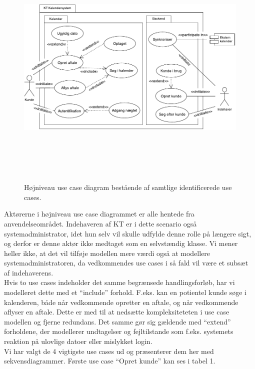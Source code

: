 \documentclass[12pt]{article}   %
\begin{document}
\begin{figure}[!ht]
\begin{center}
\includegraphics[width=12cm, height=12cm]{highlevel.pdf}
\caption{Højniveau use case diagram bestående af samtlige identificerede use cases.}
\label{fig:use}
\end{center}
\end{figure}

 
Aktørerne i højniveau use case diagrammet er alle hentede fra anvendelseområdet. Indehaveren af KT er i dette scenario også systemadministrator, idet hun selv vil
skulle udfylde denne rolle på længere sigt, og derfor er denne aktør ikke medtaget som en selvstændig klasse. Vi mener heller ikke, at det vil tilføje modellen mere værdi også at modellere systemadministratoren, da vedkommendes use cases i så fald vil være et subsæt af indehaverens.\\
Hvis to use cases indeholder det samme begrænsede handlingsforløb, har vi modelleret dette med et ``include'' forhold. F.eks. kan en potientel kunde søge i kalenderen,
både når vedkommende opretter en aftale, og når vedkommende aflyser en aftale. Dette er med til at nedsætte kompleksiteteten i use case modellen og fjerne redundans. Det samme gør sig gældende med ``extend'' forholdene, der modellerer undtagelser og fejltilstande som f.eks. systemets reaktion på ulovlige datoer eller mislykket login.\\
Vi har valgt de 4 vigtigste use cases ud og præsenterer dem her med sekvensdiagrammer. Første use case ``Opret kunde'' kan ses i tabel 1.\\
\end{document}
